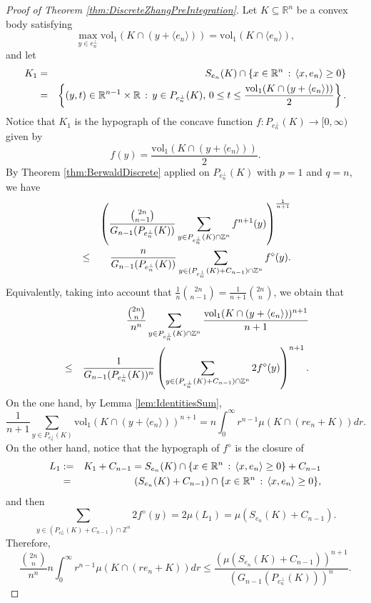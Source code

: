\documentclass[10pt]{amsart}
\def\R{\mathbb{R}}
\def\Z{\mathbb{Z}}
\def\vol{\mathrm{vol}}
\numberwithin{equation}{section}
\begin{document}
\begin{proof}[Proof of Theorem \ref{thm:DiscreteZhangPreIntegration}]
Let $K\subseteq\R^n$ be a convex body satisfying $$\max_{y\in e_n^\perp}\vol_1(K\cap(y+\langle e_n\rangle))=\vol_1(K\cap\langle e_n\rangle),$$ and let
\begin{eqnarray*}
K_1&=&S_{e_n}(K)\cap\{x\in\R^n\,:\,\langle x,e_n\rangle\geq0\}\cr
&=&\left\{(y,t)\in\R^{n-1}\times\R\,:\,y\in P_{e_n^\perp}(K),\,0\leq t\leq\frac{\vol_1(K\cap(y+\langle e_n\rangle))}{2}\right\}.
\end{eqnarray*}
Notice that $K_1$ is the hypograph of the concave function $f:P_{e_n^\perp}(K)\to[0,\infty)$ given by
$$
f(y)=\frac{\vol_1(K\cap(y+\langle e_n\rangle))}{2}.
$$
By Theorem \ref{thm:BerwaldDiscrete} applied on $P_{e_n^\perp}(K)$ with $p=1$ and $q=n$, we have
\begin{eqnarray*}
&&\left(\frac{{{2n}\choose{n-1}}}{G_{n-1}(P_{e_n^\perp}(K))}\sum_{y\in P_{e_n^\perp}(K)\cap\Z^n}f^{n+1}(y)\right)^\frac{1}{n+1}\cr
&\leq&\frac{n}{G_{n-1}(P_{e_n^\perp}(K))}\sum_{y\in (P_{e_n^\perp}(K)+C_{n-1})\cap\Z^n}f^{\diamond}(y).
\end{eqnarray*}
Equivalently, taking into account that $\frac{1}{n}{{2n}\choose{n-1}}=\frac{1}{n+1}{{2n}\choose{n}}$, we obtain that
\begin{eqnarray*}
&&\frac{{{2n}\choose{n}}}{n^n}\sum_{y\in P_{e_n^\perp}(K)\cap\Z^n}\frac{\vol_1(K\cap(y+\langle e_n\rangle))^{n+1}}{n+1}\cr
&\leq&\frac{1}{G_{n-1}(P_{e_n^\perp}(K))^n}\left(\sum_{y\in (P_{e_n^\perp}(K)+C_{n-1})\cap\Z^n}2f^{\diamond}(y)\right)^{n+1}.
\end{eqnarray*}
On the one hand, by Lemma \ref{lem:IdentitiesSum},
$$
\frac{1}{n+1}\sum_{y\in P_{e_n^\perp}(K)}\vol_1(K\cap(y+\langle e_n\rangle))^{n+1}=n\int_0^{\infty}r^{n-1}\mu(K\cap(re_n+K))dr.
$$
On the other hand, notice that the hypograph of $f^\diamond$ is the closure of
\begin{eqnarray*}
L_1&:=&K_1+C_{n-1}=S_{e_n}(K)\cap\{x\in\R^n\,:\,\langle x,e_n\rangle\geq0\}+C_{n-1}\cr
&=&(S_{e_n}(K)+C_{n-1})\cap\{x\in\R^n\,:\,\langle x,e_n\rangle\geq0\},
\end{eqnarray*}
and then
$$
\sum_{y\in (P_{e_n^\perp}(K)+C_{n-1})\cap\Z^n}2f^{\diamond}(y)=2\mu(L_1)=\mu(S_{e_n}(K)+C_{n-1}).
$$
Therefore,
$$
\frac{{{2n}\choose{n}}}{n^n}n\int_0^\infty r^{n-1}\mu(K\cap(re_n+K))dr\leq\frac{(\mu(S_{e_n}(K)+C_{n-1}))^{n+1}}{(G_{n-1}(P_{e_n^\perp}(K)))^n}.
$$
\end{proof}
\end{document}
